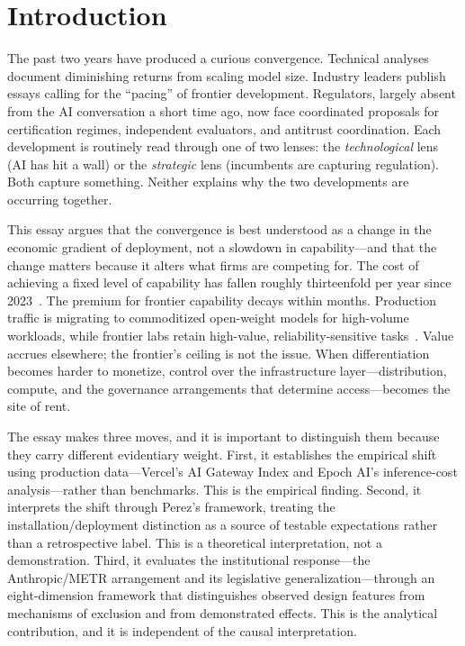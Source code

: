 \section{Introduction}

The past two years have produced a curious convergence. Technical analyses document diminishing returns from scaling model size. Industry leaders publish essays calling for the ``pacing'' of frontier development. Regulators, largely absent from the AI conversation a short time ago, now face coordinated proposals for certification regimes, independent evaluators, and antitrust coordination. Each development is routinely read through one of two lenses: the \emph{technological} lens (AI has hit a wall) or the \emph{strategic} lens (incumbents are capturing regulation). Both capture something. Neither explains why the two developments are occurring together.

This essay argues that the convergence is best understood as a change in the economic gradient of deployment, not a slowdown in capability---and that the change matters because it alters what firms are competing for. The cost of achieving a fixed level of capability has fallen roughly thirteenfold per year since 2023~\cite{epochai2026}. The premium for frontier capability decays within months. Production traffic is migrating to commoditized open-weight models for high-volume workloads, while frontier labs retain high-value, reliability-sensitive tasks~\cite{vercel2026}. Value accrues elsewhere; the frontier's ceiling is not the issue. When differentiation becomes harder to monetize, control over the infrastructure layer---distribution, compute, and the governance arrangements that determine access---becomes the site of rent.

The essay makes three moves, and it is important to distinguish them because they carry different evidentiary weight. First, it establishes the empirical shift using production data---Vercel's AI Gateway Index and Epoch AI's inference-cost analysis---rather than benchmarks. This is the empirical finding. Second, it interprets the shift through Perez's framework, treating the installation/deployment distinction as a source of testable expectations rather than a retrospective label. This is a theoretical interpretation, not a demonstration. Third, it evaluates the institutional response---the Anthropic/METR arrangement and its legislative generalization---through an eight-dimension framework that distinguishes observed design features from mechanisms of exclusion and from demonstrated effects. This is the analytical contribution, and it is independent of the causal interpretation.

